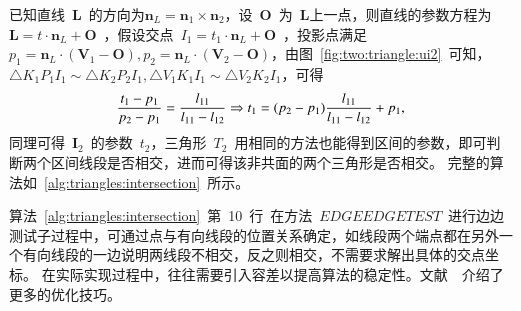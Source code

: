 已知直线~$\bm{L}$~的方向为$\bm{n}_L = \bm{n}_1 \times \bm{n}_2$，设~$\bm{O}$~为~$\bm{L}$上一点，则直线的参数方程为
$\bm{L} = t \cdot \bm{n}_L + \bm{O}$~，假设交点~$I_1 = t_1 \cdot \bm{n}_L + \bm{O}$~，投影点满足
$p_1 = \bm{n}_L \cdot(\bm{V}_1 - \bm{O}), p_2 = \bm{n}_L \cdot (\bm{V}_2 - \bm{O})$，由图~\ref{fig:two:triangle:ui2}~可知，
$\bigtriangleup K_1P_1I_1 \sim \bigtriangleup K_2P_2I_1, \bigtriangleup V_1K_1I_1 \sim \bigtriangleup V_2K_2I_1$，可得
\begin{equation}
  \frac{t_1 - p_1}{p_2-p_1} = \frac{l_{11}}{l_{11}-l_{12}} \Rightarrow \newline
   t_1 = (p_2-p_1)\frac{l_{11}}{l_{11}-l_{12}} + p_1,
  \label{equa:triangle:intersectionline:param}
\end{equation}
同理可得~$\bm{I}_2$~的参数~$t_2$，三角形~$T_2$~用相同的方法也能得到区间的参数，即可判断两个区间线段是否相交，进而可得该非共面的两个三角形是否相交。
完整的算法如~\ref{alg:triangles:intersection}~所示。

算法~\ref{alg:triangles:intersection}~第~10~行~在方法~$EDGEEDGETEST$~进行边边测试子过程中，可通过点与有向线段的位置关系确定，如线段两个端点都在另外一个有向线段的一边说明两线段不相交，反之则相交，不需要求解出具体的交点坐标。
在实际实现过程中，往往需要引入容差以提高算法的稳定性。文献~~介绍了更多的优化技巧。

